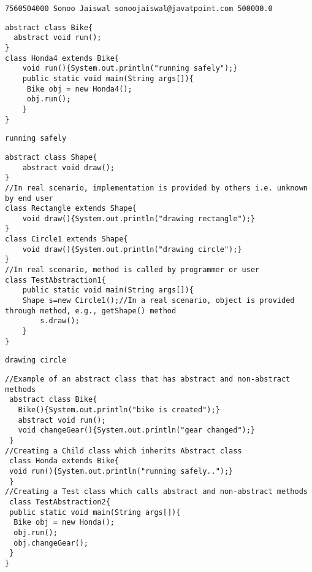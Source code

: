 \documentclass{book}
\def\lthtmlcheckvsize{\ifdim\ht\sizebox<\vsize 
  \ifdim\wd\sizebox<\hsize\expandafter\hfill\fi \expandafter\vfill
  \else\expandafter\vss\fi}%
\begin{document}
{\newpage\clearpage
{}%
\begin{lstlisting}
7560504000 Sonoo Jaiswal sonoojaiswal@javatpoint.com 500000.0
\end{lstlisting}%
\lthtmlfigureZ
\lthtmlcheckvsize\clearpage}

{\newpage\clearpage
{}%
\begin{lstlisting}
abstract class Bike{  
  abstract void run();  
}  
class Honda4 extends Bike{  
	void run(){System.out.println("running safely");}  
	public static void main(String args[]){  
	 Bike obj = new Honda4();  
	 obj.run();  
	}  
}  
\end{lstlisting}%
\lthtmlfigureZ
\lthtmlcheckvsize\clearpage}

{\newpage\clearpage
{}%
\begin{lstlisting}
running safely
\end{lstlisting}%
\lthtmlfigureZ
\lthtmlcheckvsize\clearpage}

{\newpage\clearpage
{}%
\begin{lstlisting}
abstract class Shape{  
	abstract void draw();  
}  
//In real scenario, implementation is provided by others i.e. unknown by end user  
class Rectangle extends Shape{  
	void draw(){System.out.println("drawing rectangle");}  
}  
class Circle1 extends Shape{  
	void draw(){System.out.println("drawing circle");}  
}  
//In real scenario, method is called by programmer or user  
class TestAbstraction1{  
	public static void main(String args[]){  
	Shape s=new Circle1();//In a real scenario, object is provided through method, e.g., getShape() method  
		s.draw();  
	}  
}  
\end{lstlisting}%
\lthtmlfigureZ
\lthtmlcheckvsize\clearpage}

{\newpage\clearpage
{}%
\begin{lstlisting}
drawing circle
\end{lstlisting}%
\lthtmlfigureZ
\lthtmlcheckvsize\clearpage}

{\newpage\clearpage
{}%
\begin{lstlisting}
//Example of an abstract class that has abstract and non-abstract methods  
 abstract class Bike{  
   Bike(){System.out.println("bike is created");}  
   abstract void run();  
   void changeGear(){System.out.println("gear changed");}  
 }  
//Creating a Child class which inherits Abstract class  
 class Honda extends Bike{  
 void run(){System.out.println("running safely..");}  
 }  
//Creating a Test class which calls abstract and non-abstract methods  
 class TestAbstraction2{  
 public static void main(String args[]){  
  Bike obj = new Honda();  
  obj.run();  
  obj.changeGear();  
 }  
}  
\end{lstlisting}%
\lthtmlfigureZ
\lthtmlcheckvsize\clearpage}
\end{document}
